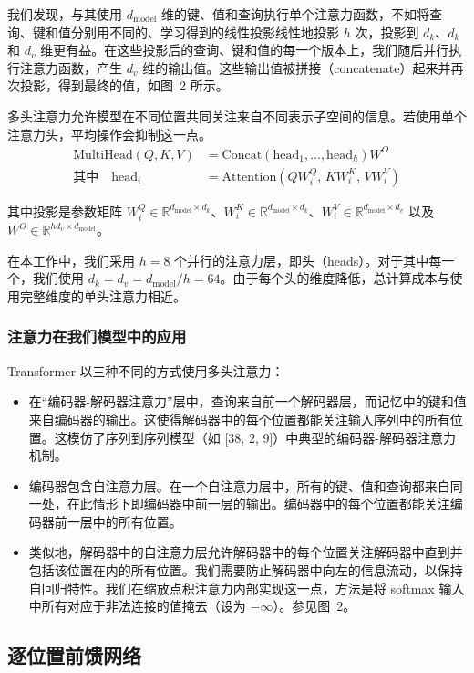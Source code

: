 \documentclass[11pt,UTF8,fontset=fandol]{ctexart}
\newcommand{\dmodel}{d_{\mathrm{model}}}
\begin{document}
我们发现，与其使用 $\dmodel$ 维的键、值和查询执行单个注意力函数，不如将查询、键和值分别用不同的、学习得到的线性投影线性地投影 $h$ 次，投影到 $d_k$、$d_k$ 和 $d_v$ 维更有益。在这些投影后的查询、键和值的每一个版本上，我们随后并行执行注意力函数，产生 $d_v$ 维的输出值。这些输出值被拼接（concatenate）起来并再次投影，得到最终的值，如图~2 所示。

多头注意力允许模型在不同位置共同关注来自不同表示子空间的信息。若使用单个注意力头，平均操作会抑制这一点。
\begin{align*}
\mathrm{MultiHead}(Q, K, V) &= \mathrm{Concat}(\mathrm{head}_1, \ldots, \mathrm{head}_h)W^O\\
\text{其中}\quad \mathrm{head}_i &= \mathrm{Attention}(QW_i^Q,\, KW_i^K,\, VW_i^V)
\end{align*}

其中投影是参数矩阵 $W_i^Q \in \mathbb{R}^{\dmodel \times d_k}$、$W_i^K \in \mathbb{R}^{\dmodel \times d_k}$、$W_i^V \in \mathbb{R}^{\dmodel \times d_v}$ 以及 $W^O \in \mathbb{R}^{hd_v \times \dmodel}$。

在本工作中，我们采用 $h = 8$ 个并行的注意力层，即头（heads）。对于其中每一个，我们使用 $d_k = d_v = \dmodel/h = 64$。由于每个头的维度降低，总计算成本与使用完整维度的单头注意力相近。

\subsubsection{注意力在我们模型中的应用}

Transformer 以三种不同的方式使用多头注意力：
\begin{itemize}[leftmargin=2em]
\item 在“编码器-解码器注意力”层中，查询来自前一个解码器层，而记忆中的键和值来自编码器的输出。这使得解码器中的每个位置都能关注输入序列中的所有位置。这模仿了序列到序列模型（如 [38, 2, 9]）中典型的编码器-解码器注意力机制。
\item 编码器包含自注意力层。在一个自注意力层中，所有的键、值和查询都来自同一处，在此情形下即编码器中前一层的输出。编码器中的每个位置都能关注编码器前一层中的所有位置。
\item 类似地，解码器中的自注意力层允许解码器中的每个位置关注解码器中直到并包括该位置在内的所有位置。我们需要防止解码器中向左的信息流动，以保持自回归特性。我们在缩放点积注意力内部实现这一点，方法是将 softmax 输入中所有对应于非法连接的值掩去（设为 $-\infty$）。参见图~2。
\end{itemize}

\subsection{逐位置前馈网络}
\end{document}
